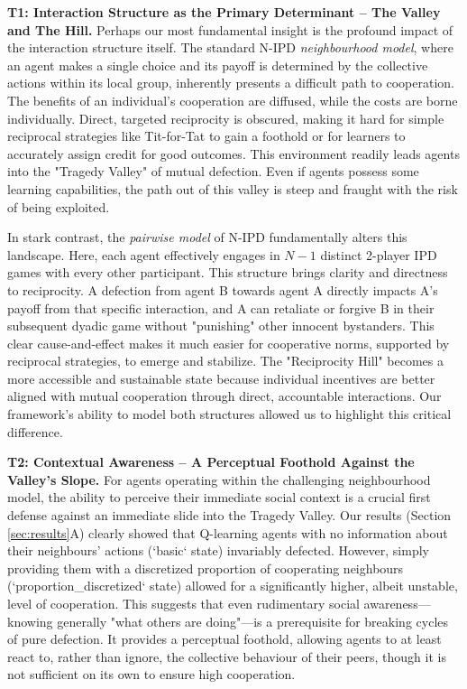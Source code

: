 \documentclass[]{llncs} %
\begin{document}
\textbf{T1: Interaction Structure as the Primary Determinant – The Valley and The Hill.}
Perhaps our most fundamental insight is the profound impact of the interaction structure itself.
The standard N-IPD \textit{neighbourhood model}, where an agent makes a single choice and its payoff is determined by the collective actions within its local group, inherently presents a difficult path to cooperation. The benefits of an individual's cooperation are diffused, while the costs are borne individually. Direct, targeted reciprocity is obscured, making it hard for simple reciprocal strategies like Tit-for-Tat to gain a foothold or for learners to accurately assign credit for good outcomes. This environment readily leads agents into the "Tragedy Valley" of mutual defection. Even if agents possess some learning capabilities, the path out of this valley is steep and fraught with the risk of being exploited.

In stark contrast, the \textit{pairwise model} of N-IPD fundamentally alters this landscape. Here, each agent effectively engages in $N-1$ distinct 2-player IPD games with every other participant. This structure brings clarity and directness to reciprocity. A defection from agent B towards agent A directly impacts A's payoff from that specific interaction, and A can retaliate or forgive B in their subsequent dyadic game without "punishing" other innocent bystanders. This clear cause-and-effect makes it much easier for cooperative norms, supported by reciprocal strategies, to emerge and stabilize. The "Reciprocity Hill" becomes a more accessible and sustainable state because individual incentives are better aligned with mutual cooperation through direct, accountable interactions. Our framework's ability to model both structures allowed us to highlight this critical difference.

\textbf{T2: Contextual Awareness – A Perceptual Foothold Against the Valley's Slope.}
For agents operating within the challenging neighbourhood model, the ability to perceive their immediate social context is a crucial first defense against an immediate slide into the Tragedy Valley. Our results (Section \ref{sec:results}A) clearly showed that Q-learning agents with no information about their neighbours' actions (`basic` state) invariably defected. However, simply providing them with a discretized proportion of cooperating neighbours (`proportion_discretized` state) allowed for a significantly higher, albeit unstable, level of cooperation. This suggests that even rudimentary social awareness—knowing generally "what others are doing"—is a prerequisite for breaking cycles of pure defection. It provides a perceptual foothold, allowing agents to at least react to, rather than ignore, the collective behaviour of their peers, though it is not sufficient on its own to ensure high cooperation.
\end{document}
